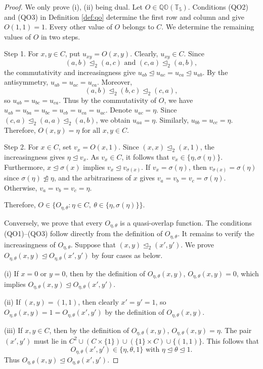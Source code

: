 \documentclass[preprint,12pt]{elsarticle}
\begin{document}
\begin{proof}
We only prove (i), (ii) being dual. Let $O\in\mathbb{QO}(\mathbb{T}_5)$. Conditions (QO2) and (QO3) in Definition \ref{def:qo} determine the first row and column and give $O(1,1)=1$. Every other value of $O$ belongs to $C$. We determine the remaining values of $O$ in two steps.

Step 1. For $x,y\in C$, put $u_{xy}=O(x,y)$. Clearly, $u_{xy}\in C$. Since
$$
 (a,b)\trianglelefteq_2(a,c)
 \mbox{ and }
 (c,a)\trianglelefteq_2(a,b),
$$
the commutativity and increasingness give
$u_{ab}\trianglelefteq u_{ac}=u_{ca}\trianglelefteq u_{ab}$. By the antisymmetry, $u_{ab}=u_{ac}=u_{ca}$. Moreover,
$$
 (a,b)\trianglelefteq_2(b,c)\trianglelefteq_2(c,a),
$$
so $u_{ab}=u_{bc}=u_{ca}$. Thus by the commutativity of $O$, we have $u_{ab}=u_{ba}=u_{bc}=u_{cb}=u_{ca}=u_{ac}$. Denote $u_{ac}=\eta$. Since
$(c,a)\trianglelefteq_2(a,a)\trianglelefteq_2(a,b)$, we obtain $u_{aa}=\eta$. Similarly, $u_{bb}=u_{cc}=\eta$. Therefore,
$O(x,y)=\eta\mbox{ for all }x,y\in C$.

Step 2.  For $x\in C$, set $v_x=O(x,1)$. Since $(x,x)\trianglelefteq_2(x,1)$, the increasingness gives $\eta\trianglelefteq v_x$. As $v_x\in C$, it follows that
$v_x\in\{\eta,\sigma(\eta)\}$. Furthermore, $x\trianglelefteq\sigma(x)$ implies $v_x\trianglelefteq v_{\sigma(x)}$. If $v_x=\sigma(\eta)$, then $v_{\sigma(x)}=\sigma(\eta)$ since $\sigma(\eta)\ntrianglelefteq\eta$, and the arbitrariness of $x$ gives $v_a=v_b=v_c=\sigma(\eta)$. Otherwise, $v_a=v_b=v_c=\eta$.

Therefore, $O\in \{O_{\eta,\theta}:\eta\in C,\ \theta\in\{\eta,\sigma(\eta)\}\}$.

Conversely, we prove that every $O_{\eta,\theta}$ is a quasi-overlap function. The conditions (QO1)--(QO3) follow directly from the definition of $O_{\eta,\theta}$. It remains to verify the increasingness of $O_{\eta,\theta}$. Suppose that $(x,y)\trianglelefteq_2(x',y')$. We prove $O_{\eta,\theta}(x,y)\trianglelefteq O_{\eta,\theta}(x',y')$ by four cases as below.

(i) If $x=0$ or $y=0$, then by the definition of $O_{\eta,\theta}(x,y)$, $O_{\eta,\theta}(x,y)=0$, which implies $O_{\eta,\theta}(x,y)\trianglelefteq O_{\eta,\theta}(x',y')$.

(ii) If $(x,y)=(1,1)$, then clearly $x'=y'=1$, so $O_{\eta,\theta}(x,y)=1= O_{\eta,\theta}(x',y')$ by the definition of $O_{\eta,\theta}(x,y)$.

(iii) If $x,y\in C$, then by the definition of $O_{\eta,\theta}(x,y)$, $O_{\eta,\theta}(x,y)=\eta$. The pair $(x',y')$ must lie in $C^2\cup(C\times\{1\})\cup(\{1\}\times C)\cup\{(1,1)\}$. This follows that $$O_{\eta,\theta}(x',y')\in\{\eta,\theta,1\}\mbox{ with }\eta\trianglelefteq\theta\trianglelefteq1.$$
Thus $O_{\eta,\theta}(x,y)\trianglelefteq O_{\eta,\theta}(x',y')$.


\end{proof}
\end{document}
